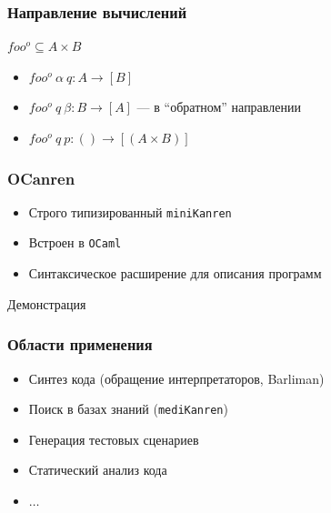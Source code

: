 \documentclass{beamer}
\newcommand{\miniKanren}{\texttt{miniKanren}}
\newcommand{\ocaml}{\texttt{OCaml}}
\newcommand{\mediKanren}{\texttt{mediKanren}}
\begin{document}
\begin{frame}[fragile]
  \transwipe[direction=90]
  \frametitle{Направление вычислений}

\begin{center}
  $foo^o \subseteq A \times B$
\end{center}

\begin{itemize}
  \item $foo^o \ \alpha \ q : A \rightarrow [B]$
  \item $foo^o \ q \ \beta  : B \rightarrow [A]$ --- в ``обратном'' направлении
  \item $foo^o \ q \ p      : () \rightarrow [(A \times B)] $ 
\end{itemize}  
 
\end{frame}

\begin{frame}[fragile]
  \transwipe[direction=90]
  \frametitle{OCanren}

\begin{itemize} 
  \item Строго типизированный \miniKanren
  \item Встроен в \ocaml
  \item Синтаксическое расширение для описания программ 
\end{itemize}
 
 \vfill
 
 \begin{center}
 Демонстрация
 \end{center}
\end{frame}

\begin{frame}[fragile]
  \transwipe[direction=90]
  \frametitle{Области применения}

\begin{itemize} 
  \item Синтез кода (обращение интерпретаторов, Barliman)
  \item Поиск в базах знаний (\mediKanren)
  \item Генерация тестовых сценариев
  \item Статический анализ кода 
  \item $\dots$
\end{itemize}
 
\end{frame}
\end{document}
